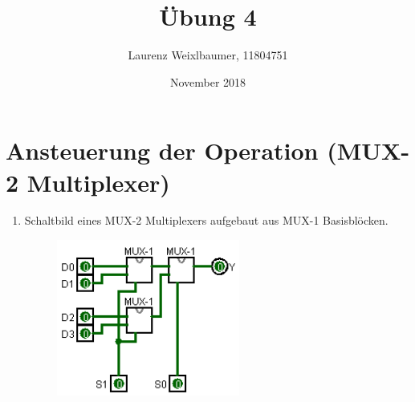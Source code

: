 \documentclass{article}
\title{Übung 4}
\author{Laurenz Weixlbaumer, 11804751}
\date{November 2018}
\begin{document}
\maketitle

\section{Ansteuerung der Operation \normalsize{(MUX-2 Multiplexer)}}

\begin{enumerate}[label=(\alph*)]

\item Schaltbild eines MUX-2 Multiplexers aufgebaut aus MUX-1 Basisblöcken.

\begin{figure}[htp]
\begin{center}
\includegraphics[width=6cm]{mux2_circuit.png}
\end{center}
\end{figure}

\end{enumerate}
\end{document}
